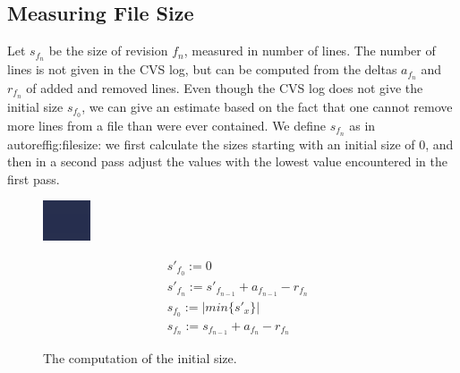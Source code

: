 \subsection{Measuring File Size}

Let $s_{f_n}$ be the size of revision $f_n$, measured in number of lines. The number of lines is not given in the CVS log, but can be computed from the deltas $a_{f_n}$ and $r_{f_n}$ of added and removed lines. Even though the CVS log does not give the initial size $s_{f_0}$, we can give an estimate based on the fact that one cannot remove more lines from a file than were ever contained. We define $s_{f_n}$ as in autoref{fig:filesize}: we first calculate the sizes starting with an initial size of 0, and then in a second pass adjust the values with the lowest value encountered in the first pass.

\begin{figure}[htbp]
\begin{minipage}[c]{.45\linewidth}
\includegraphics[width=1.2\linewidth]{minimum}
 \end{minipage}
 \hfill
 \begin{minipage}[c]{.5\linewidth}
\begin{eqnarray}
& s'_{f_0} := 0 \nonumber \\
& s'_{f_n} := s'_{f_{n-1}} + a_{f_{n-1}} - r_{f_n} \nonumber  \\
& s_{f_0} := \vert min \{ s'_x \} \vert \nonumber \\
& s_{f_n} := s_{f_{n-1}} + a_{f_n} - r_{f_n} \nonumber
 \end{eqnarray}
 \end{minipage}
\caption{The computation of the initial size.}
\label{fig:filesize}
\end{figure}

